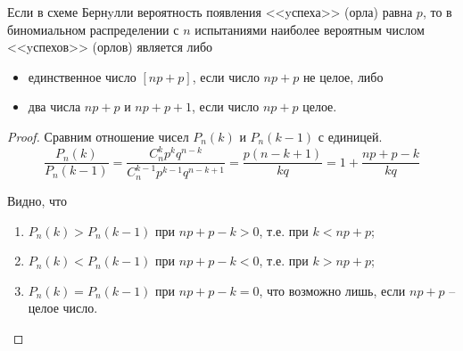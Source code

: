 \begin{theorem}
	 Если в схеме Бернyлли вероятность появления <<yспеха>>
(орла) равна $p$, то в биномиальном распределении с $n$ испытаниями наиболее вероятным числом <<yспехов>> (орлов) является либо
	\begin{itemize}
		\item единственное число $[np + p]$, если число $np + p$ не целое, либо
		\item два числа $np + p$ и $np + p + 1$, если число $np + p$ целое.
	\end{itemize}
\end{theorem}
\begin{proof}
	Сравним отношение чисел $P_n (k)$ и $P_n (k - 1)$ с единицей.
\begin{equation}
	\frac{P_n (k)}{P_n (k - 1)}=\frac{C_n^k p^k q^{n-k}}{C_n^{k-1} p^{k-1} q^{n-k+1}}=\frac{p(n-k+1)}{kq}=1+\frac{np+p-k}{kq}
\end{equation}

Видно, что
\begin{enumerate}
	\item $P_n (k) > P_n (k - 1)$ при $np + p - k > 0$, т.е. при $k < np + p$;
	\item $P_n (k) < P_n (k - 1)$ при $np + p - k < 0$, т.е. при $k > np + p$;
	\item $P_n (k) = P_n (k - 1)$ при $np + p - k = 0$, что возможно лишь, если $np + p$ -- целое число.
\end{enumerate}
\end{proof}
